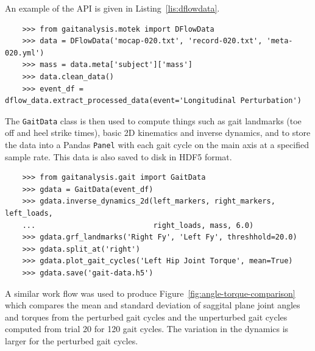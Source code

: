 \documentclass[fleqn,10pt]{wlpeerj}
\begin{document}
An example of the API is given in Listing~\ref{lis:dflowdata}.

\begin{listing}
  \begin{verbatim}
    >>> from gaitanalysis.motek import DFlowData
    >>> data = DFlowData('mocap-020.txt', 'record-020.txt', 'meta-020.yml')
    >>> mass = data.meta['subject']['mass']
    >>> data.clean_data()
    >>> event_df = dflow_data.extract_processed_data(event='Longitudinal Perturbation')
  \end{verbatim}
  \cprotect\caption{Python interpreter session showing how one could load a
    trial into memory, extract the subject's mass from the meta data, run the
    data cleaning process, and finally extract a Pandas \verb|DataFrame|
    containing all of the time histories for a specific event in the trial.}
  \label{lis:dflowdata}
\end{listing}

The \verb|GaitData| class is then used to compute things such as gait landmarks
(toe off and heel strike times), basic 2D kinematics and inverse dynamics, and to store the
data into a Pandas \verb|Panel| with each gait cycle on the main axis at a
specified sample rate. This data is also saved to disk in HDF5 format.

\begin{listing*}
  \begin{verbatim}
    >>> from gaitanalysis.gait import GaitData
    >>> gdata = GaitData(event_df)
    >>> gdata.inverse_dynamics_2d(left_markers, right_markers, left_loads,
    ...                           right_loads, mass, 6.0)
    >>> gdata.grf_landmarks('Right Fy', 'Left Fy', threshhold=20.0)
    >>> gdata.split_at('right')
    >>> gdata.plot_gait_cycles('Left Hip Joint Torque', mean=True)
    >>> gdata.save('gait-data.h5')
  \end{verbatim}
  \cprotect\caption{Python interpreter session showing how one could compute
    the inverse dynamics (joint angles and torques), identify the gait
    landmarks (e.g. heel strikes), split the data with respect to the gait
    landmarks in a Pandas \verb|Panel|, plot the mean and standard deviation of
    one time history with respect to the gait cycles, and save the data to disk.}
  \label{lis:dflowdata}
\end{listing*}

A similar work flow was used to produce Figure~\ref{fig:angle-torque-comparison}
which compares the mean and standard deviation of saggital plane joint angles
and torques from the perturbed gait cycles and the unperturbed gait cycles
computed from trial 20 for 120 gait cycles. The variation in the dynamics is
larger for the perturbed gait cycles.
\end{document}
